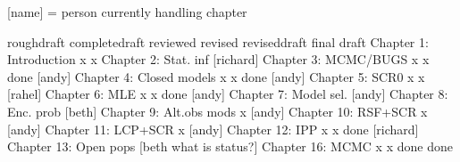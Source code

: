 [name] = person currently handling chapter


                          roughdraft   completedraft  reviewed  revised  reviseddraft  final draft
Chapter 1: Introduction       x              x
Chapter 2: Stat. inf        [richard]
Chapter 3: MCMC/BUGS          x              x         done     [andy]
Chapter 4: Closed models      x              x         done     [andy]
Chapter 5: SCR0               x              x        [rahel]
Chapter 6: MLE                x              x         done     [andy]
Chapter 7: Model sel.       [andy]
Chapter 8: Enc. prob        [beth]
Chapter 9: Alt.obs mods       x           [andy]
Chapter 10: RSF+SCR           x           [andy]
Chapter 11: LCP+SCR           x           [andy]
Chapter 12: IPP               x              x         done     [richard]
Chapter 13: Open pops       [beth what is status?]
Chapter 16: MCMC              x              x         done      done


